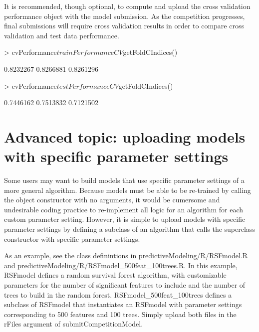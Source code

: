 \documentclass[10pt]{article}
\begin{document}
It is recommended, though optional, to compute and upload the cross validation performance object with the model submission. As the competition progresses, final submissions will require cross validation results in order to compare cross validation and test data performance.
\begin{Schunk}
\end{Schunk}

\begin{Schunk}
\begin{Sinput}
> cvPerformance$trainPerformanceCV$getFoldCIndices()
\end{Sinput}
\begin{Soutput}
[1] 0.8232267 0.8266881 0.8261296
\end{Soutput}
\begin{Sinput}
> cvPerformance$testPerformanceCV$getFoldCIndices()
\end{Sinput}
\begin{Soutput}
[1] 0.7446162 0.7513832 0.7121502
\end{Soutput}
\end{Schunk}

\section{Advanced topic: uploading models with specific parameter settings}
Some users may want to build models that use specific parameter settings of a more general algorithm. Because models must be able to be re-trained by calling the object constructor with no arguments, it would be cumersome and undesirable coding practice to re-implement all logic for an algorithm for each custom parameter setting. However, it is simple to upload models with specific parameter settings by defining a subclass of an algorithm that calls the superclass constructor with specific parameter settings.

As an example, see the class definintions in predictiveModeling/R/RSFmodel.R and predictiveModeling/R/RSFmodel\_500feat\_100trees.R. In this example, RSFmodel defines a random survival forest algorithm, with customizable parameters for the number of significant features to include and the number of trees to build in the random forest. RSFmodel\_500feat\_100trees defines a subclass of RSFmodel that instantiates an RSFmodel with parameter settings corresponding to 500 features and 100 trees. Simply upload both files in the rFiles argument of submitCompetitionModel.
\end{document}
